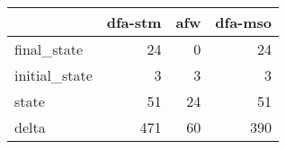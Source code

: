 \begin{tabular}{lrrr}
\toprule
{} &  dfa-stm &  afw &  dfa-mso \\
\midrule
final\_state   &       24 &    0 &       24 \\
initial\_state &        3 &    3 &        3 \\
state         &       51 &   24 &       51 \\
delta         &      471 &   60 &      390 \\
\bottomrule
\end{tabular}
